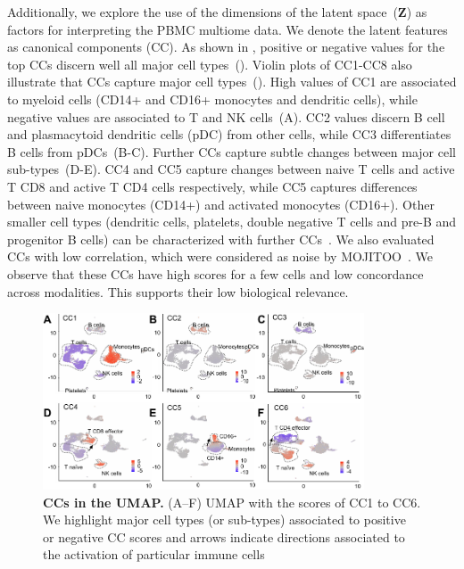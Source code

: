 Additionally, we explore the use of the dimensions of the latent space~($\textbf{Z}$) as factors for interpreting the PBMC multiome data. We denote the latent features as canonical components (CC). As shown in , positive or negative values for the top CCs discern well all major cell types~(). Violin plots of CC1-CC8 also illustrate that CCs capture major cell types~(). High values of CC1 are associated to myeloid cells (CD14+ and CD16+ monocytes and dendritic cells), while negative values are associated to T and NK cells~(A). CC2 values discern B cell and plasmacytoid dendritic cells (pDC) from other cells, while CC3 differentiates B cells from pDCs~(B-C). Further CCs capture subtle changes between major cell sub-types~(D-E). CC4 and CC5 capture changes between naive T cells and active T CD8 and active T CD4 cells respectively, while CC5 captures differences between naive monocytes (CD14+) and activated monocytes (CD16+). Other smaller cell types (dendritic cells, platelets, double negative T cells and pre-B and progenitor B cells) can be characterized with further CCs~. We also evaluated CCs with low correlation, which were considered as noise by MOJITOO~. We observe that these CCs have high scores for a few cells and low concordance across modalities. This supports their low biological relevance.


\begin{figure}[!h]
	\centering
	\includegraphics[width=0.85\textwidth]{CC_UMAP/fig}
	\vspace{0.1cm}
	\caption[CCs in the UMAP.]{\textbf{CCs in the UMAP.} (A–F) UMAP with the scores of CC1 to CC6. We highlight major cell types (or sub-types) associated to positive or negative CC scores and arrows indicate directions associated to the activation of particular immune cells}
	\label{fig:CC_UMAP}
\end{figure}


